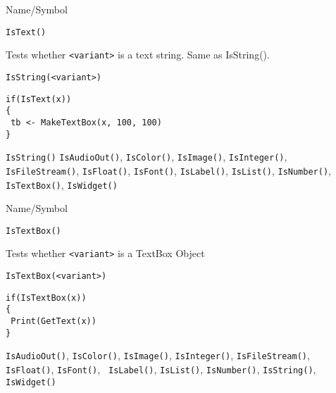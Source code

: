 \rl


\begin{desc}{Name/Symbol}
\item[Name/Symbol]	\verb+IsText()+

\item[Description]	Tests whether \verb+<variant>+ is a text string.
  Same as IsString().

\item[Usage]		
\begin{verbatim}
IsString(<variant>)
\end{verbatim}

\item[Example]	
\begin{verbatim}
if(IsText(x))
{
 tb <- MakeTextBox(x, 100, 100)
}
\end{verbatim}

\item[See Also] \verb+IsString()+	\verb+IsAudioOut()+, \verb+IsColor()+, \verb+IsImage()+, \verb+IsInteger()+, 
		\verb+IsFileStream()+, \verb+IsFloat()+, \verb+IsFont()+, \verb+IsLabel()+,
		\verb+IsList()+, \verb+IsNumber()+, \verb+IsTextBox()+, \verb+IsWidget()+
\end{desc}

\rl



\begin{desc}{Name/Symbol}
\item[Name/Symbol]	\verb+IsTextBox()+

\item[Description]	Tests whether \verb+<variant>+ is a TextBox Object

\item[Usage]
\begin{verbatim}
IsTextBox(<variant>)
\end{verbatim}

\item[Example]	
\begin{verbatim}
if(IsTextBox(x))
{
 Print(GetText(x))
}
\end{verbatim}

\item[See Also] \verb+IsAudioOut()+, \verb+IsColor()+,
  \verb+IsImage()+, \verb+IsInteger()+, \verb+IsFileStream()+,
  \verb+IsFloat()+, \verb+IsFont()+, \verb+ IsLabel()+,
  \verb+IsList()+, \verb+IsNumber()+, \verb+IsString()+,
  \verb+IsWidget()+
\end{desc}

\rl

